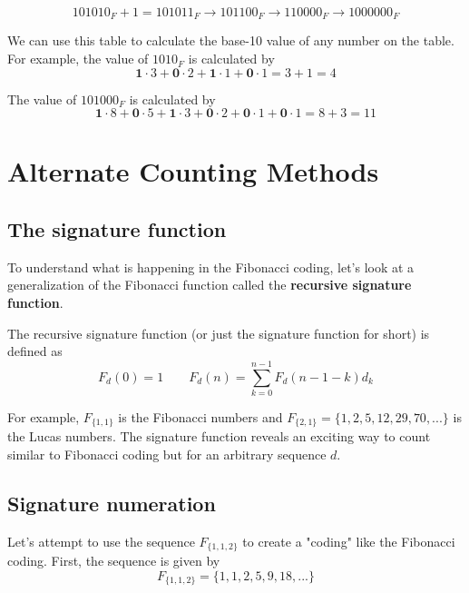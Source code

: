 \documentclass{article}
\begin{document}
\begin{equation}101010_F + 1 = 101011_F \rightarrow 101100_F \rightarrow 110000_F \rightarrow 1000000_F\end{equation}

\noindent We can use this table to calculate the base-10 value of any number on the table. For example, the value of $1010_F$ is calculated by \begin{equation}\textbf{1} \cdot 3 + \textbf{0} \cdot 2 + \textbf{1} \cdot 1 + \textbf{0} \cdot 1 = 3 + 1 = 4 \end{equation}

\noindent The value of $101000_F$ is calculated by \begin{equation}\textbf{1} \cdot 8 + \textbf{0} \cdot 5 + \textbf{1} \cdot 3 + \textbf{0} \cdot 2 + \textbf{0} \cdot 1 + \textbf{0} \cdot 1  = 8 + 3 = 11\end{equation}

\section{Alternate Counting Methods}

\subsection{The signature function}

\noindent To understand what is happening in the Fibonacci coding, let's look at a generalization of the Fibonacci function called the \textbf{recursive signature function}.

\noindent The recursive signature function (or just the signature function for short) is defined as \begin{equation} F_d(0) = 1 \quad \quad F_d(n) = \sum_{k=0}^{n-1} F_d(n-1-k) d_k\end{equation}

\noindent For example, $F_{\{1, 1\}}$ is the Fibonacci numbers and $F_{\{2, 1\}} = \{1, 2, 5, 12, 29, 70, ...\}$ is the Lucas numbers. The signature function reveals an exciting way to count similar to Fibonacci coding but for an arbitrary sequence $d$.

\subsection{Signature numeration}

\noindent Let's attempt to use the sequence $F_{\{1,1,2\}}$ to create a "coding" like the Fibonacci coding. First, the sequence is given by \begin{equation}F_{\{1,1,2\}} = \{1, 1, 2, 5, 9, 18, ...\}\end{equation}
\end{document}
